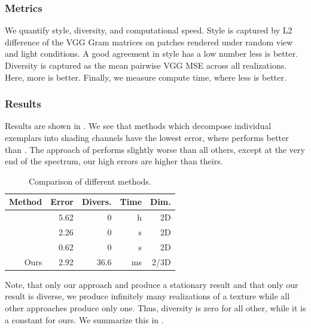 \documentclass[acmtog, review, anonymous]{acmart}
\begin{document}
\subsubsection{Metrics}
We quantify style, diversity, and computational speed.
Style is captured by L2 difference of the VGG Gram matrices on patches rendered under random view and light conditions.
A good agreement in style has a low number \ie less is better.
Diversity is captured as the mean pairwise VGG MSE across all realizations.
Here, more is better.
Finally, we measure compute time, where less is better.


\subsubsection{Results}
Results are shown in .
We see that methods which decompose individual exemplars into shading channels have the lowest error, where \citet{deschaintre2018single} performs better than \citet{li2018materials}.
The approach of \citet{aittala2016reflectance} performs slightly worse than all others, except at the very end of the spectrum, \ie our high errors are higher than theirs.

\begin{table}
\setlength{\tabcolsep}{3pt}
\caption{Comparison of different methods.}
\label{tbl:Results}
\centering
\begin{tabular}{rrrrr}
    \multicolumn{1}{c}{Method}&
    \multicolumn{1}{c}{Error}&
    \multicolumn{1}{c}{Divers.}&
    \multicolumn{1}{c}{Time}&
    \multicolumn{1}{c}{Dim.}
    \\
    \toprule
    \citet{aittala2016reflectance}&5.62&0&h&2D\\
    \citet{li2018materials}&2.26&0&s&2D\\ 
    \citet{deschaintre2018single}&0.62&0&s&2D\\
    Ours&2.92&36.6&ms&2/3D\\
    \bottomrule
\end{tabular}
\end{table}

Note, that only our approach and \citet{aittala2016reflectance} produce a stationary result and that only our result is diverse, \ie we produce infinitely many realizations of a texture while all other approaches produce only one.
Thus, diversity is zero for all other, while it is a constant for ours.
We summarize this in .
\end{document}
